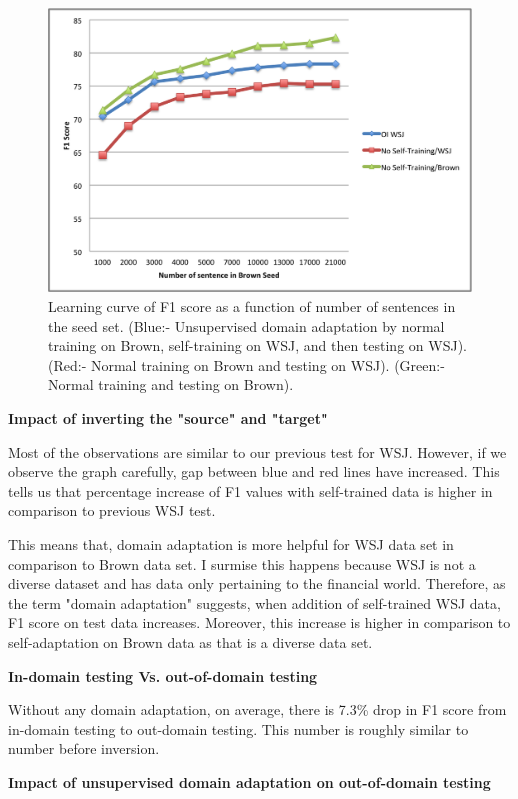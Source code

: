 \begin{figure}[ht!]
\centering
\includegraphics[width=140mm]{exp3.png}
\caption{Learning curve of F1 score as a function of number of sentences in the seed set. (Blue:- Unsupervised domain adaptation by normal training on Brown, self-training on WSJ, and then testing on WSJ). (Red:- Normal training on Brown and testing on WSJ). (Green:- Normal training and testing on Brown).}
\label{accuracy}
\end{figure}

\textbf {Impact of inverting the "source" and "target"}

Most of the observations are similar to our previous test for WSJ. However, if we observe the graph carefully, gap between blue and red lines have increased. This tells us that percentage increase of F1 values with self-trained data is higher in comparison to previous WSJ test. 

This means that, domain adaptation is more helpful for WSJ data set in comparison to Brown data set. I surmise this happens because WSJ is not a diverse dataset and has data only pertaining to the financial world. Therefore, as the term "domain adaptation" suggests, when addition of self-trained WSJ data, F1 score on test data increases. Moreover, this increase is higher in comparison to self-adaptation on Brown data as that is a diverse data set.

\textbf {In-domain testing Vs. out-of-domain testing}

Without any domain adaptation, on average, there is 7.3\% drop in F1 score from in-domain testing to out-domain testing. This number is roughly similar to number before inversion.

\textbf {Impact of unsupervised domain adaptation on out-of-domain testing}

